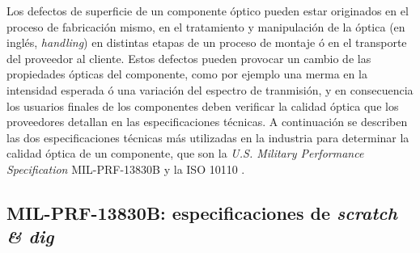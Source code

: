 \begin{figure}[H]
	\begin{floatrow}
	\end{floatrow}
\end{figure}

Los defectos de superficie de un componente óptico pueden estar originados en el proceso de fabricación mismo, en el tratamiento y manipulación de la óptica (en inglés, \textit{handling}) en distintas etapas de un proceso de montaje ó en el transporte del proveedor al cliente. Estos defectos pueden provocar un cambio de las propiedades ópticas del componente, como por ejemplo una merma en la intensidad esperada ó una variación del espectro de tranmisión, y en consecuencia los usuarios finales de los componentes deben verificar la calidad óptica que los proveedores detallan en las especificaciones técnicas. A continuación se describen las dos especificaciones técnicas más utilizadas en la industria para determinar la calidad óptica de un componente, que son la \textit{U.S. Military Performance Specification} MIL-PRF-13830B y la ISO 10110 \cite{milprf}\cite{iso10110}.

\singlespacing
\subsection{MIL-PRF-13830B: especificaciones de \textit{scratch \& dig}}

